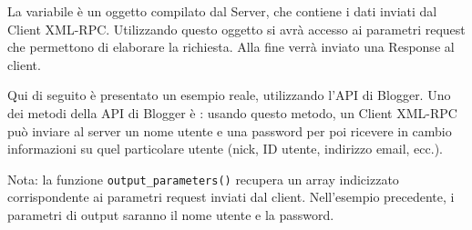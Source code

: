 
La variabile  è un oggetto compilato dal Server, che contiene i dati inviati dal Client XML-RPC. Utilizzando questo oggetto si avrà accesso ai parametri request che permettono di elaborare la richiesta. Alla fine verrà inviato una Response al client.

Qui di seguito è presentato un esempio reale, utilizzando l'API di Blogger. Uno dei metodi della API di Blogger è : usando questo metodo, un Client XML-RPC può inviare al server un nome utente e una password per poi ricevere in cambio informazioni su quel particolare utente (nick, ID utente, indirizzo email, ecc.).


Nota: la funzione \verb|output_parameters()| recupera un array indicizzato corrispondente ai parametri request inviati dal client. Nell'esempio precedente, i parametri di output saranno il nome utente e la password.

